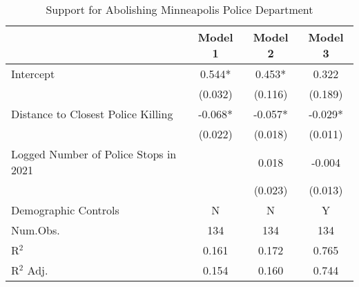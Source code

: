 \begin{table}[t!]

\caption{\label{tab:minn-reg-mini} Support for Abolishing Minneapolis Police Department}

\centering
\begin{tabular}[t]{lccc}
\toprule
& Model 1 & Model 2 & Model 3\\
\midrule
Intercept & 0.544* & 0.453* & 0.322\\
& (0.032) & (0.116) & (0.189)\\
Distance to Closest Police Killing & -0.068* & -0.057* & -0.029*\\
& (0.022) & (0.018) & (0.011)\\
Logged Number of Police Stops in 2021 &  & 0.018 & -0.004\\
&  & (0.023) & (0.013)\\
Demographic Controls & N & N & Y \\
\midrule
Num.Obs. & 134 & 134 & 134\\
R$^2$ & 0.161 & 0.172 & 0.765\\
R$^2$ Adj. & 0.154 & 0.160 & 0.744\\
\bottomrule
\end{tabular}

\end{table}